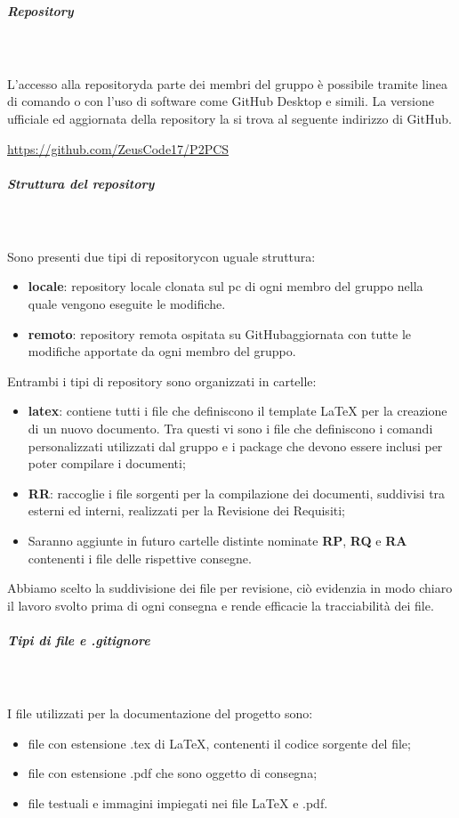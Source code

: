 	\subparagraph{Repository} \mbox{}\\ \mbox{}\\
	L'accesso alla repository\glosp da parte dei membri del gruppo è possibile tramite linea di comando o con l'uso di software come GitHub Desktop e simili.
	La versione ufficiale ed aggiornata della repository la si trova al seguente indirizzo di GitHub\glo. \newline \newline
	\centerline{\url{https://github.com/ZeusCode17/P2PCS}}
	\subparagraph{Struttura del repository} \mbox{}\\ \mbox{}\\
	Sono presenti due tipi di repository\glosp con uguale struttura:
	\begin{itemize}
		\item \textbf{locale}: repository locale clonata sul pc di ogni membro del gruppo nella quale vengono eseguite le modifiche.
		\item \textbf{remoto}: repository remota ospitata su GitHub\glosp aggiornata con tutte le modifiche apportate da ogni membro del gruppo.
	\end{itemize}			
	Entrambi i tipi di repository sono organizzati in cartelle:
	\begin{itemize}
		\item \textbf{latex}: contiene tutti i file che definiscono il template \LaTeX{} per la creazione di un nuovo documento. Tra questi vi sono i file che definiscono i comandi personalizzati utilizzati dal gruppo e i package che devono essere inclusi per poter compilare i documenti;
		\item \textbf{RR}: raccoglie i file sorgenti per la compilazione dei documenti, suddivisi tra esterni ed interni, realizzati per la Revisione dei Requisiti;
		\item Saranno aggiunte in futuro cartelle distinte nominate \textbf{RP}, \textbf{RQ} e \textbf{RA} contenenti i file delle rispettive consegne.
	\end{itemize}
	Abbiamo scelto la suddivisione dei file per revisione, ciò evidenzia in modo chiaro il lavoro svolto prima di ogni consegna e rende efficacie la tracciabilità dei file.
	\subparagraph{Tipi di file e .gitignore} \mbox{}\\ \mbox{}\\
	I file utilizzati per la documentazione del progetto sono:
	\begin{itemize}
		\item file con estensione .tex di \LaTeX{}, contenenti il codice sorgente del file;
		\item file con estensione .pdf che sono oggetto di consegna;
		\item file testuali e immagini impiegati nei file \LaTeX{} e .pdf.
	\end{itemize}			
